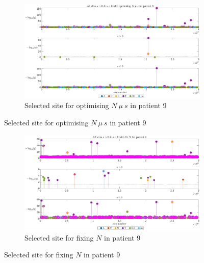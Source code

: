 \documentclass[12pt]{article}
\begin{document}
\begin{figure}[H]
    \centering
    \hspace{-6cm}
    \vspace{-4cm}
    \begin{subfigure}{0.7\textwidth}
    \hspace{-2.5cm}
            \includegraphics[height=0.5\textheight]{figures/patient/pt9/pt9_site_all_opt.eps}
        
        \caption{Selected site for optimising $N\ \mu\ s$ in patient 9}
        \label{fig:subfig1}
    \end{subfigure}
\end{figure}
\vspace{4cm}
\begin{figure}[H]
    \ContinuedFloat
    \begin{subfigure}{0.7\textwidth}
    
    \hspace{-2.5cm}
            \includegraphics[height=0.5\textheight]{figures/patient/pt9/pt9_siteunder_selection_all_fixN.eps}
       
        \caption{Selected site for fixing $N$ in patient 9}
        \label{fig:subfig2}
    \end{subfigure}
    \end{figure}
\end{document}
